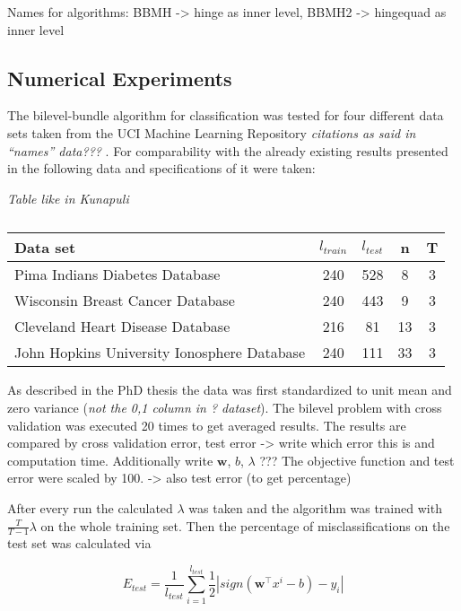 Names for algorithms: BBMH -> hinge as inner level, BBMH2 -> hingequad as inner level 

\subsection{Numerical Experiments}

The bilevel-bundle algorithm for classification was tested for four different data sets taken from the UCI Machine Learning Repository \emph{citations as said in ``names'' data??? }.
For comparability with the already existing results presented in \cite{Kunapuli2008} the following data and specifications of it were taken:

\begin{center}
\emph{Table like in Kunapuli}
\begin{table}[H]%
	\begin{tabular}{lcccc}
		\hline
    Data set & \(l_{train}\) & \(l_{test}\) & n & T \\
		\hline
		Pima Indians Diabetes Database & 240 & 528 & 8 & 3 \\
		Wisconsin Breast Cancer Database & 240 & 443 & 9 & 3 \\
		Cleveland Heart Disease Database & 216 & 81 & 13 & 3 \\
		John Hopkins University Ionosphere Database & 240 & 111 & 33 & 3
	\end{tabular}
	\caption{}
	\label{}
\end{table}
\end{center}

As described in the PhD thesis the data was first standardized to unit mean and zero variance (\emph{not the 0,1 column in ? dataset}). The bilevel problem with cross validation was executed 20 times to get averaged results.
The results are compared by cross validation error, test error -> write which error this is and computation time.
Additionally write \(\bm{w}\), \(b\), \(\lambda\) ???
The objective function and test error were scaled by 100. -> also test error (to get percentage) 

After every run the calculated \(\lambda\) was taken and the algorithm was trained with \(\frac{T}{T-1} \lambda\) on the whole training set.
Then the percentage of misclassifications on the test set was calculated via

\begin{equation}
	E_{test} = \frac{1}{l_{test}}\sum_{i=1}^{l_{test}}{\frac{1}{2}|sign\left(\bm{w}^{\top}x^i-b \right)-y_i|}
\label{test_err}
\end{equation}

